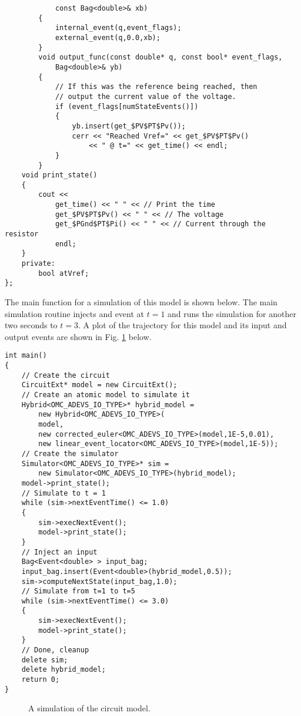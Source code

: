 \begin{verbatim}
            const Bag<double>& xb)
        {
            internal_event(q,event_flags);
            external_event(q,0.0,xb);
        }
        void output_func(const double* q, const bool* event_flags,
            Bag<double>& yb)
        {
            // If this was the reference being reached, then
            // output the current value of the voltage.
            if (event_flags[numStateEvents()])
            {
                yb.insert(get_$PV$PT$Pv());
                cerr << "Reached Vref=" << get_$PV$PT$Pv()
                    << " @ t=" << get_time() << endl;
            }
        }
    void print_state()
    {
        cout <<
            get_time() << " " << // Print the time
            get_$PV$PT$Pv() << " " << // The voltage
            get_$PGnd$PT$Pi() << " " << // Current through the resistor
            endl;
    }
    private:
        bool atVref;
};
\end{verbatim}

The main function for a simulation of this model is shown below. The main simulation routine injects and event at $t=1$ and runs the simulation for another two seconds to $t=3$. A plot of the trajectory for this model and its input and output events are shown in Fig. \ref{fig:circuit} below.
\begin{verbatim}
int main()
{
    // Create the circuit
    CircuitExt* model = new CircuitExt();
    // Create an atomic model to simulate it
    Hybrid<OMC_ADEVS_IO_TYPE>* hybrid_model =
        new Hybrid<OMC_ADEVS_IO_TYPE>(
        model,
        new corrected_euler<OMC_ADEVS_IO_TYPE>(model,1E-5,0.01),
        new linear_event_locator<OMC_ADEVS_IO_TYPE>(model,1E-5));
    // Create the simulator
    Simulator<OMC_ADEVS_IO_TYPE>* sim =
        new Simulator<OMC_ADEVS_IO_TYPE>(hybrid_model);
    model->print_state();
    // Simulate to t = 1
    while (sim->nextEventTime() <= 1.0)
    {
        sim->execNextEvent();
        model->print_state();
    }
    // Inject an input
    Bag<Event<double> > input_bag;
    input_bag.insert(Event<double>(hybrid_model,0.5));
    sim->computeNextState(input_bag,1.0);
    // Simulate from t=1 to t=5
    while (sim->nextEventTime() <= 3.0)
    {
        sim->execNextEvent();
        model->print_state();
    }
    // Done, cleanup
    delete sim;
    delete hybrid_model;
    return 0;
}
\end{verbatim}

\begin{figure}[ht]
\centering
{}
\caption{A simulation of the circuit model.}
\label{fig:circuit}
\end{figure}
